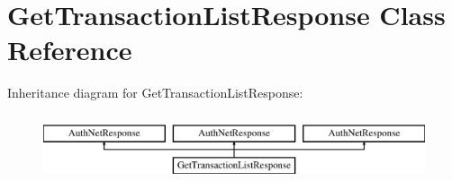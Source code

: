 \hypertarget{interface_get_transaction_list_response}{
\section{GetTransactionListResponse Class Reference}
\label{interface_get_transaction_list_response}
}
Inheritance diagram for GetTransactionListResponse:\begin{figure}[H]
\begin{center}
\leavevmode
\includegraphics[height=2.000000cm]{interface_get_transaction_list_response}
\end{center}
\end{figure}
